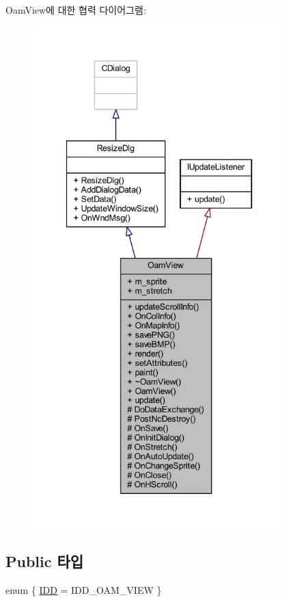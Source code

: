 Oam\+View에 대한 협력 다이어그램\+:\nopagebreak
\begin{figure}[H]
\begin{center}
\leavevmode
\includegraphics[height=550pt]{class_oam_view__coll__graph}
\end{center}
\end{figure}
\subsection*{Public 타입}
\begin{DoxyCompactItemize}
\item 
enum \{ \mbox{\hyperlink{class_oam_view_ac29ce9205f4917f10053370f06262098aab00e4e9b26ccb7800ace12861a0304c}{I\+DD}} = I\+D\+D\+\_\+\+O\+A\+M\+\_\+\+V\+I\+EW
 \}
\end{DoxyCompactItemize}
